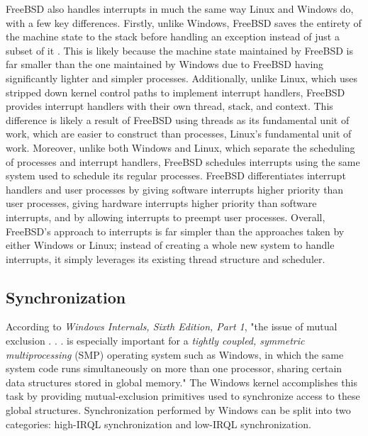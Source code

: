 \documentclass[onecolumn, draftclsnofoot,10pt, compsoc]{IEEEtran}
\begin{document}
FreeBSD also handles interrupts in much the same way Linux and Windows do, with a few key differences. Firstly, unlike Windows, FreeBSD saves the entirety of the machine state to the stack before handling an exception instead of just a subset of it \cite{FreeBSD}. This is likely because the machine state maintained by FreeBSD is far smaller than the one maintained by Windows due to FreeBSD having significantly lighter and simpler processes. Additionally, unlike Linux, which uses stripped down kernel control paths to implement interrupt handlers, FreeBSD provides interrupt handlers with their own thread, stack, and context. This difference is likely a result of FreeBSD using threads as its fundamental unit of work, which are easier to construct than processes, Linux's fundamental unit of work. Moreover, unlike both Windows and Linux, which separate the scheduling of processes and interrupt handlers, FreeBSD schedules interrupts using the same system used to schedule its regular processes. FreeBSD differentiates interrupt handlers and user processes by giving software interrupts higher priority than user processes, giving hardware interrupts higher priority than software interrupts, and by allowing interrupts to preempt user processes. Overall, FreeBSD's approach to interrupts is far simpler than the approaches taken by either Windows or Linux; instead of creating a whole new system to handle interrupts, it simply leverages its existing thread structure and scheduler.  
\subsection{Synchronization}
According to \textit{Windows Internals, Sixth Edition, Part 1}, "the issue of mutual exclusion . . . is especially important for a \textit{tightly coupled, symmetric multiprocessing} (SMP) operating system such as Windows, in which the same system code runs simultaneously on more than one processor, sharing certain data structures stored in global memory." The Windows kernel accomplishes this task by providing mutual-exclusion primitives used to synchronize access to these global structures. Synchronization performed by Windows can be split into two categories: high-IRQL synchronization and low-IRQL synchronization. 
\end{document}

